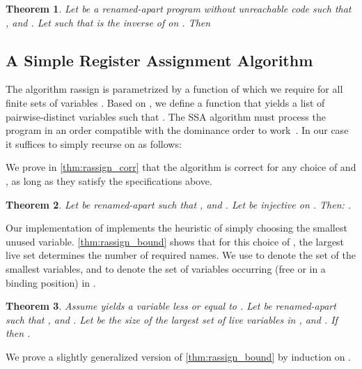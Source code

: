 \documentclass[openright,a4paper,11pt]{scrartcl}
\newcommand{\myref}[1]{\autoref{#1}}
\theoremstyle{plain}
\newtheorem{theorem}{Theorem}
\theoremstyle{plain}
\theoremstyle{plain}
\theoremstyle{plain}
\theoremstyle{nonumberplain}
\begin{document}
\begin{theorem}
\label{thm:inj_alpha}
Let  be a renamed-apart program without unreachable code such that ,  and .
Let  such that  is the inverse of  on . Then

\end{theorem}










\newcommand{\ra}[3]{\ensuremath{\mathit{rassign}\,#3\,#1}}
\newcommand{\freshv}{\ensuremath{\mathit{fresh}}}
\newcommand{\fresh}[1]{\ensuremath{\freshv\,#1}}
\newcommand{\freshl}[2]{\ensuremath{\mathit{freshlist}\,#1\,#2}}

\subsection{A Simple Register Assignment Algorithm}
\label{sec:ra_algo}


The algorithm \textup{rassign} is parametrized by a function  of which we require  for all finite sets of variables .
Based on , we define a function  that yields a list of  pairwise-distinct variables such that .
The SSA algorithm must process the program in an order compatible with the dominance order to work~\cite{DBLP:conf/cc/HackGG06}.
In our case it suffices to simply recurse on  as follows:


We prove in \myref{thm:rassign_corr} that the algorithm is correct for any choice of  and ,
as long as they satisfy the specifications above.

\begin{theorem}
Let  be renamed-apart such that ,  and .
Let  be injective on .
Then: .

\label{thm:rassign_corr}
\end{theorem}

\newcommand{\occurvars}[1]{\ensuremath{\mathcal{V}_O(#1)}}
\newcommand{\segment}[1]{\ensuremath{\mathcal{S}(#1)}}

Our implementation of  implements the heuristic of simply choosing the smallest unused variable.
\myref{thm:rassign_bound} shows that for this choice of , the largest live set determines the number of required names.
We use  to denote the set of the  smallest variables, and
 to denote the set of variables occurring (free or in a binding position) in .
\begin{theorem}
Assume  yields a variable less or equal to .
Let  be renamed-apart such that ,  and .
Let  be the size of the largest set of live variables in , and .
If  then
.
\label{thm:rassign_bound}
\end{theorem}
We prove a slightly generalized version of \myref{thm:rassign_bound} by induction on .
\end{document}

